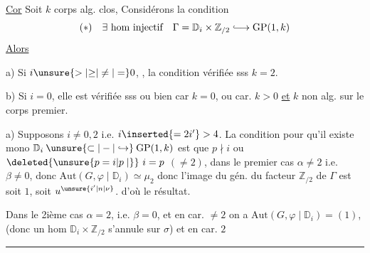 \uline{Cor} Soit $k$ corps alg. clos,  Considérons la condition
\[
(\ast)\quad\exists\ \text{hom injectif}\quad\Gamma=\mathbb D_i\times\mathbb Z_{/2}\lhook\joinrel\longrightarrow\mathrm{GP}(1,k)
\]
\uline{Alors}

a) Si $i\unsure{>|{\geq}|\ne|=}0$, , la condition   vérifiée sss  $k=2$.

b) Si $i=0$, elle est vérifiée sss ou bien car $k=0$, ou  car. $k>0$ \uline{et} $k$ non alg. sur le corps premier.


a) Supposons $i\ne0,2$ i.e. $i\inserted{=2i'}>4$. La condition pour qu'il existe mono $\mathbb D_i\mathbin{\unsure{\subset|-|\hookrightarrow}}\mathrm{GP}(1,k)$ est que $p\nmid i$ ou $\deleted{\unsure{p=i|p\mid}}\ i=p$ $(\ne2)$, dans le premier cas $\alpha\ne2$ i.e. $\beta\ne0$, donc $\mathrm{Aut}(G,\varphi\mid\mathbb D_i)\simeq\mu_2$ \deleted{\unsure{$=\mu$}} donc l'image du gén. \inserted{$\sigma$} du facteur $\mathbb Z_{/2}$ de $\Gamma$ est soit $1$,  soit $u^{\unsure{i'|n|\nu}}$. d'où le résultat.

Dans le 2ième cas $\alpha=2$, i.e. $\beta=0$, et en car. $\ne2$ on a $\mathrm{Aut}(G,\varphi\mid\mathbb D_i)=(1)$, (donc un hom $\mathbb D_i\times\mathbb Z_{/2}$ s'annule sur $\sigma$) et en car. $2$\qquad\rule{3cm}{0.3pt}

